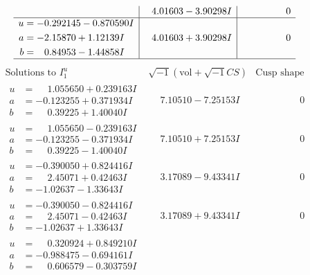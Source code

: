 \documentclass[1p]{elsarticle_modified}
\theoremstyle{definition}
\newcommand{\I}{\sqrt{-1}}
\begin{document}
$$\begin{array}{c|c|c}
 & \phantom{-}4.01603 - 3.90298 I & \phantom{-0.000000 } 0 \\ \hline\begin{aligned}
u &= -0.292145 - 0.870590 I \\
a &= -2.15870 + 1.12139 I \\
b &= \phantom{-}0.84953 - 1.44858 I\end{aligned}
 & \phantom{-}4.01603 + 3.90298 I & \phantom{-0.000000 } 0\\
 \hline 
 \end{array}$$\newpage$$\begin{array}{c|c|c}  
\text{Solutions to }I^u_{1}& \I (\text{vol} + \sqrt{-1}CS) & \text{Cusp shape}\\
 \hline 
\begin{aligned}
u &= \phantom{-}1.055650 + 0.239163 I \\
a &= -0.123255 + 0.371934 I \\
b &= \phantom{-}0.39225 + 1.40040 I\end{aligned}
 & \phantom{-}7.10510 - 7.25153 I & \phantom{-0.000000 } 0 \\ \hline\begin{aligned}
u &= \phantom{-}1.055650 - 0.239163 I \\
a &= -0.123255 - 0.371934 I \\
b &= \phantom{-}0.39225 - 1.40040 I\end{aligned}
 & \phantom{-}7.10510 + 7.25153 I & \phantom{-0.000000 } 0 \\ \hline\begin{aligned}
u &= -0.390050 + 0.824416 I \\
a &= \phantom{-}2.45071 + 0.42463 I \\
b &= -1.02637 - 1.33643 I\end{aligned}
 & \phantom{-}3.17089 - 9.43341 I & \phantom{-0.000000 } 0 \\ \hline\begin{aligned}
u &= -0.390050 - 0.824416 I \\
a &= \phantom{-}2.45071 - 0.42463 I \\
b &= -1.02637 + 1.33643 I\end{aligned}
 & \phantom{-}3.17089 + 9.43341 I & \phantom{-0.000000 } 0 \\ \hline\begin{aligned}
u &= \phantom{-}0.320924 + 0.849210 I \\
a &= -0.988475 - 0.694161 I \\
b &= \phantom{-}0.606579 - 0.303759 I\end{aligned}

\end{array}$$
\end{document}
